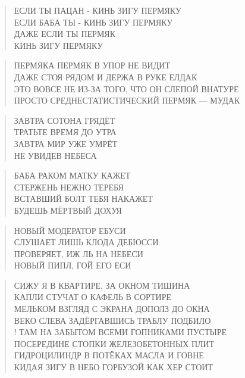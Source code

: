 \poemtitle{***}
\begin{verse}
ЕСЛИ ТЫ ПАЦАН - КИНЬ ЗИГУ ПЕРМЯКУ\\
ЕСЛИ БАБА ТЫ - КИНЬ ЗИГУ ПЕРМЯКУ\\
ДАЖЕ ЕСЛИ ТЫ ПЕРМЯК\\
КИНЬ ЗИГУ ПЕРМЯКУ
\end{verse}

\poemtitle{***}
\begin{verse}
ПЕРМЯКА ПЕРМЯК В УПОР НЕ ВИДИТ\\
ДАЖЕ СТОЯ РЯДОМ И ДЕРЖА В РУКЕ ЕЛДАК\\
ЭТО ВОВСЕ НЕ ИЗ-ЗА ТОГО, ЧТО ОН СЛЕПОЙ ВНАТУРЕ\\
ПРОСТО СРЕДНЕСТАТИСТИЧЕСКИЙ ПЕРМЯК — МУДАК
\end{verse}

\poemtitle{***}
\begin{verse}
ЗАВТРА СОТОНА ГРЯДЁТ \\
ТРАТЬТЕ ВРЕМЯ ДО УТРА\\
ЗАВТРА МИР УЖЕ УМРЁТ\\
НЕ УВИДЕВ НЕБЕСА
\end{verse}

\poemtitle{***}
\begin{verse}
БАБА РАКОМ МАТКУ КАЖЕТ\\
СТЕРЖЕНЬ НЕЖНО ТЕРЕБЯ\\
ВСТАВШИЙ БОЛТ ТЕБЯ НАКАЖЕТ\\
БУДЕШЬ МЁРТВЫЙ ДОХУЯ
\end{verse}

\poemtitle{***}
\begin{verse}
НОВЫЙ МОДЕРАТОР ЕБУСИ\\
СЛУШАЕТ ЛИШЬ КЛОДА ДЕБЮССИ\\
ПРОВЕРЯЕТ, ИЖ ЛЬ НА НЕБЕСИ\\
НОВЫЙ ПИПЛ, ГОЙ ЕГО ЕСИ
\end{verse}

\poemtitle{***}
\begin{verse}
СИЖУ Я В КВАРТИРЕ, ЗА ОКНОМ ТИШИНА\\
КАПЛИ СТУЧАТ О КАФЕЛЬ В СОРТИРЕ\\
МЕЛЬКОМ ВЗГЛЯД С ЭКРАНА ДОПОЛЗ ДО ОКНА\\
ВЕКО СЛЕВА ЗАДЁРГАВШИСЬ ТРАБЛУ ПОДБИЛО\\!
ТАМ НА ЗАБЫТОМ ВСЕМИ ГОПНИКАМИ ПУСТЫРЕ\\
ПОСЕРЕДИНЕ СТОПКИ ЖЕЛЕЗОБЕТОННЫХ ПЛИТ\\
ГИДРОЦИЛИНДР В ПОТЁКАХ МАСЛА И ГОВНЕ\\
КИДАЯ ЗИГУ В НЕБО ГОРБУЗОЙ КАК ХЕР СТОИТ
\end{verse}

